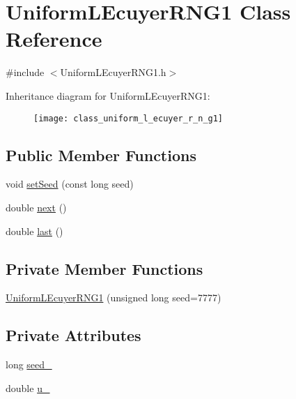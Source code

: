 \hypertarget{class_uniform_l_ecuyer_r_n_g1}{}\section{Uniform\+L\+Ecuyer\+R\+N\+G1 Class Reference}
\label{class_uniform_l_ecuyer_r_n_g1}


{\ttfamily \#include $<$Uniform\+L\+Ecuyer\+R\+N\+G1.\+h$>$}

Inheritance diagram for Uniform\+L\+Ecuyer\+R\+N\+G1\+:\begin{figure}[H]
\begin{center}
\leavevmode
\texttt{[image: class\_uniform\_l\_ecuyer\_r\_n\_g1]}
\end{center}
\end{figure}
\subsection*{Public Member Functions}
\begin{DoxyCompactItemize}
\item 
void \hyperlink{class_uniform_l_ecuyer_r_n_g1_a33e1ea51eb633a14e84d45d8c31a4e8b}{set\+Seed} (const long seed)
\item 
double \hyperlink{class_uniform_l_ecuyer_r_n_g1_a6a166e0bef412d4c85565ec0017ae489}{next} ()
\item 
double \hyperlink{class_uniform_l_ecuyer_r_n_g1_aaed8bab7d34f76064ca34b1d35b204f4}{last} ()
\end{DoxyCompactItemize}
\subsection*{Private Member Functions}
\begin{DoxyCompactItemize}
\item 
\hyperlink{class_uniform_l_ecuyer_r_n_g1_a337fc3fe276e950c8ef9e330779eedb7}{Uniform\+L\+Ecuyer\+R\+N\+G1} (unsigned long seed=7777)
\end{DoxyCompactItemize}
\subsection*{Private Attributes}
\begin{DoxyCompactItemize}
\item 
long \hyperlink{class_uniform_l_ecuyer_r_n_g1_ab722b90ba6d65dea6874ccede2edc921}{seed\+\_\+}
\item 
double \hyperlink{class_uniform_l_ecuyer_r_n_g1_ae14608c81e072a8f46ef2dd9b865e90c}{u\+\_\+}
\end{DoxyCompactItemize}

